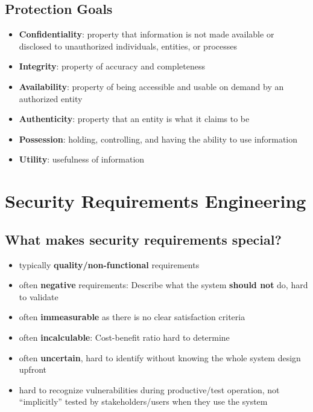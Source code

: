 \documentclass[12pt,A4]{extarticle}
\newcommand{\highlight}[1]{\textcolor{highlightColor}{\textbf{#1}}}
\begin{document}
\subsection{Protection Goals}
\begin{itemize}
  \item{\highlight{Confidentiality}: property that information is not made available or disclosed to unauthorized individuals, entities, or processes }
  \item{\highlight{Integrity}: property of accuracy and completeness }
  \item{\highlight{Availability}: property of being accessible and usable on demand by an authorized entity }
  \item{\highlight{Authenticity}: property that an entity is what it claims to be }
  \item{\highlight{Possession}: holding, controlling, and having the ability to use information \cite{TowardANewFrameworkForInformationSecurity}}
  \item{\highlight{Utility}: usefulness of information \cite{TowardANewFrameworkForInformationSecurity}}
\end{itemize}

\section{Security Requirements Engineering}
\subsection{What makes security requirements special?}
\begin{itemize}
  \item{typically \textbf{quality/non-functional} requirements}
  \item{often \textbf{negative} requirements: Describe what the system \textbf{should not} do, hard to validate}
  \item{often \textbf{immeasurable} as there is no clear satisfaction criteria}
  \item{often \textbf{incalculable}: Cost-benefit ratio hard to determine}
  \item{often \textbf{uncertain}, hard to identify without knowing the whole system design upfront}
  \item{hard to recognize vulnerabilities during productive/test operation, not ``implicitly'' tested by stakeholders/users when they use the system}
\end{itemize}
\end{document}
